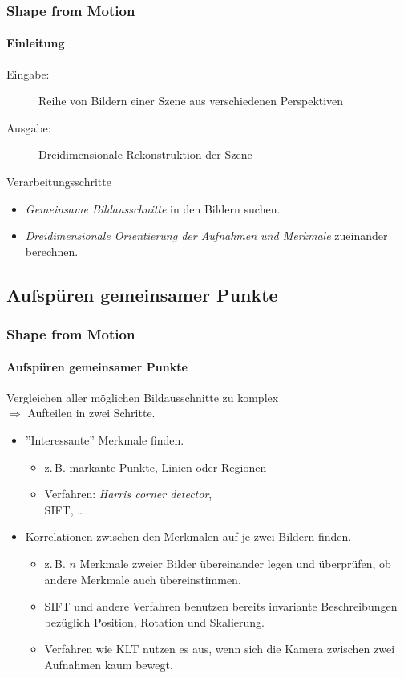 \documentclass{beamer}
\begin{document}
\begin{frame}
	\frametitle{Shape from Motion}
	\framesubtitle{Einleitung}

	\begin{description}
		\item[Eingabe:] Reihe von Bildern einer Szene aus verschiedenen Perspektiven
		\item[Ausgabe:] Dreidimensionale Rekonstruktion der Szene
	\end{description}

	\begin{block}{Verarbeitungsschritte}
		\begin{itemize}
			\item \emph{Gemeinsame Bildausschnitte} in den Bildern suchen.
			\item \emph{Dreidimensionale Orientierung der Aufnahmen und Merkmale} zueinander berechnen.
		\end{itemize}
	\end{block}
\end{frame}


\subsection{Aufspüren gemeinsamer Punkte}
\begin{frame}
	\frametitle{Shape from Motion}
	\framesubtitle{Aufspüren gemeinsamer Punkte}
	
	Vergleichen aller möglichen Bildausschnitte zu komplex \pause \\
	$\Rightarrow$ Aufteilen in zwei Schritte.
	
	\begin{itemize}
		\item ''Interessante'' Merkmale finden.
			\begin{itemize}
				\item<3-> z.\,B. markante Punkte, Linien oder Regionen
				\item<3-> Verfahren: \emph{Harris corner detector}, \\
				\acf{SIFT}, \dots
			\end{itemize}
		\item Korrelationen zwischen den Merkmalen auf je zwei Bildern finden.
			\begin{itemize}
				\item<4-> z.\,B. $n$ Merkmale zweier Bilder übereinander legen und überprüfen, ob andere Merkmale auch übereinstimmen.
				\item<4-> \ac{SIFT} und andere Verfahren benutzen bereits invariante Beschreibungen bezüglich Position, Rotation und Skalierung.
				\item<4-> Verfahren wie \ac{KLT} nutzen es aus, wenn sich die Kamera zwischen zwei Aufnahmen kaum bewegt.
			\end{itemize}
	\end{itemize}
\end{frame}
\end{document}
